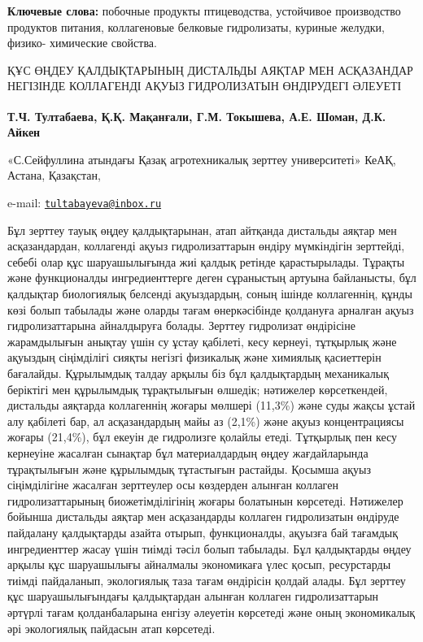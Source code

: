 {\bfseries Ключевые слова:} побочные продукты птицеводства, устойчивое
производство продуктов питания, коллагеновые белковые гидролизаты,
куриные желудки, физико- химические свойства.

ҚҰС ӨҢДЕУ ҚАЛДЫҚТАРЫНЫҢ ДИСТАЛЬДЫ АЯҚТАР МЕН АСҚАЗАНДАР НЕГІЗІНДЕ
КОЛЛАГЕНДІ АҚУЫЗ ГИДРОЛИЗАТЫН ӨНДІРУДЕГІ ӘЛЕУЕТІ

{\bfseries Т.Ч. Тултабаева}\textsuperscript{\envelope }{\bfseries , Қ.Қ. Мақанғали,
Г.М. Токышева, А.Е. Шоман, Д.К. Айкен}

«С.Сейфуллина атындағы Қазақ агротехникалық зерттеу университеті» КеАҚ,
Астана, Қазақстан,

e-mail:
\href{mailto:tultabayeva@inbox.ru}{\nolinkurl{tultabayeva@inbox.ru}}

Бұл зерттеу тауық өңдеу қалдықтарынан, атап айтқанда дистальды аяқтар
мен асқазандардан, коллагенді ақуыз гидролизаттарын өндіру мүмкіндігін
зерттейді, себебі олар құс шаруашылығында жиі қалдық ретінде
қарастырылады. Тұрақты және функционалды ингредиенттерге деген
сұраныстың артуына байланысты, бұл қалдықтар биологиялық белсенді
ақуыздардың, соның ішінде коллагеннің, құнды көзі болып табылады және
оларды тағам өнеркәсібінде қолдануға арналған ақуыз гидролизаттарына
айналдыруға болады. Зерттеу гидролизат өндірісіне жарамдылығын анықтау
үшін су ұстау қабілеті, кесу кернеуі, тұтқырлық және ақуыздың
сіңімділігі сияқты негізгі физикалық және химиялық қасиеттерін
бағалайды. Құрылымдық талдау арқылы біз бұл қалдықтардың механикалық
беріктігі мен құрылымдық тұрақтылығын өлшедік; нәтижелер көрсеткендей,
дистальды аяқтарда коллагеннің жоғары мөлшері (11,3\%) және суды жақсы
ұстай алу қабілеті бар, ал асқазандардың майы аз (2,1\%) және ақуыз
концентрациясы жоғары (21,4\%), бұл екеуін де гидролизге қолайлы етеді.
Тұтқырлық пен кесу кернеуіне жасалған сынақтар бұл материалдардың өңдеу
жағдайларында тұрақтылығын және құрылымдық тұтастығын растайды. Қосымша
ақуыз сіңімділігіне жасалған зерттеулер осы көздерден алынған коллаген
гидролизаттарының биожетімділігінің жоғары болатынын көрсетеді.
Нәтижелер бойынша дистальды аяқтар мен асқазандарды коллаген
гидролизатын өндіруде пайдалану қалдықтарды азайта отырып, функционалды,
ақуызға бай тағамдық ингредиенттер жасау үшін тиімді тәсіл болып
табылады. Бұл қалдықтарды өңдеу арқылы құс шаруашылығы айналмалы
экономикаға үлес қосып, ресурстарды тиімді пайдаланып, экологиялық таза
тағам өндірісін қолдай алады. Бұл зерттеу құс шаруашылығындағы
қалдықтардан алынған коллаген гидролизаттарын әртүрлі тағам
қолданбаларына енгізу әлеуетін көрсетеді және оның экономикалық әрі
экологиялық пайдасын атап көрсетеді.

